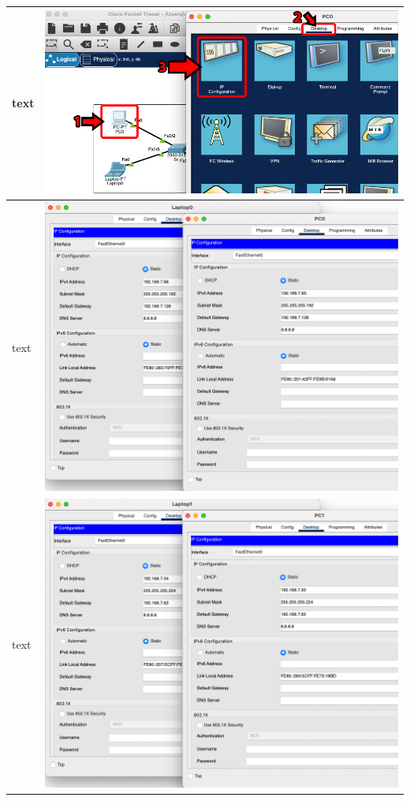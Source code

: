 \documentclass[11pt,a4paper]{report}
\begin{document}
\begin{flushleft}
\begin{center}
\begin{longtable}{ m{5cm} l }
                        text & \includegraphics[scale=0.35,valign=c]{phase2/images/p1-connectingdevices/CiscoPacketTracer_configIP} \\ \hline
                        text & \includegraphics[scale=0.34,valign=c]{phase2/images/p2-connecting2lanswithrouter/Laptop0PC0_ip} \\ \hline
                        text & \includegraphics[scale=0.34,valign=c]{phase2/images/p2-connecting2lanswithrouter/Laptop1PC1_ip} \\ \hline

\end{longtable}
\end{center}
\end{flushleft}
\end{document}
